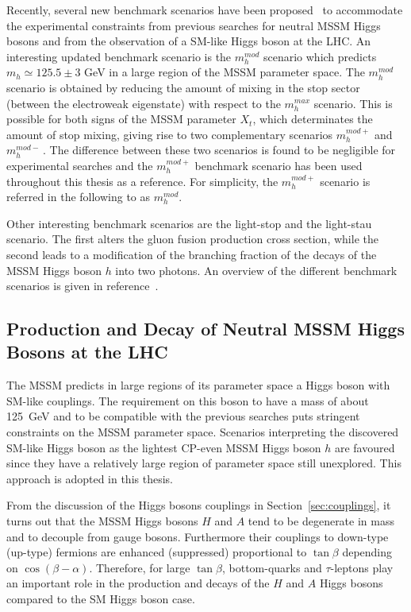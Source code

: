 Recently, several new benchmark scenarios have been proposed~\cite{LHCxsec} to  
accommodate the experimental constraints from previous searches for neutral MSSM Higgs bosons and from the observation of a SM-like Higgs boson
at the LHC. An interesting updated benchmark scenario is the $m_h^{mod}$ scenario which predicts $m_h \simeq 125.5 \pm 3 $ GeV 
in  a large region of the MSSM parameter space.  
The  $m_h^{mod}$ scenario is obtained by reducing the amount 
of mixing in the stop sector (between the electroweak eigenstate) with respect to  the  $m_h^{max}$ scenario. 
This is possible for both signs of the MSSM parameter $X_t$, which determinates the amount of  
stop mixing, giving rise to two complementary scenarios $m_h^{mod+}$ and $m_h^{mod-}\,.$
The difference between these two scenarios is found to be negligible for experimental searches and
the  $m_h^{mod+}$ benchmark scenario has been used throughout this thesis as a reference. For simplicity, the $m_h^{mod+}$ scenario is referred 
in the following to as $m_h^{mod}$.

Other interesting benchmark scenarios are the light-stop and the light-stau scenario.
The first alters  the gluon fusion production cross section, while the second leads
to a modification of the branching fraction of the decays of the MSSM Higgs boson $h$ into two photons.
An overview of the different  benchmark scenarios is given in reference~\cite{LHCxsec}. 



 


\subsection{Production and Decay of Neutral MSSM Higgs Bosons at the LHC}
The MSSM predicts in large regions of its parameter space a Higgs boson with SM-like couplings. 
The  requirement on this boson to have a mass of about 125~GeV and to be  compatible with the previous 
searches puts  stringent constraints on the MSSM parameter space.
Scenarios interpreting the discovered SM-like Higgs boson as the lightest CP-even MSSM Higgs boson $h$ 
are favoured since they have a relatively large region of parameter space still unexplored. 
This approach is adopted in  this thesis.

From the discussion of the Higgs bosons couplings  in Section~\ref{sec:couplings}, it  turns out that the MSSM Higgs bosons $H$ and $A$
tend to be degenerate in mass and to decouple from gauge bosons. Furthermore their couplings to
down-type (up-type) fermions are enhanced (suppressed) proportional to $\tan\beta$ depending on
$\cos(\beta - \alpha)$. Therefore, for large $\tan\beta$, bottom-quarks and $\tau$-leptons 
play an important role in the production and decays of the $H$ and $A$ Higgs bosons compared to 
the SM Higgs boson case.


